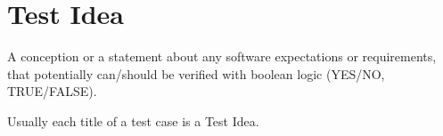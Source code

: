 \section{Test Idea}
\label{sec:Test Idea}

A conception or a statement about any software expectations or requirements, that potentially can/should be verified with boolean logic (YES/NO, TRUE/FALSE).

Usually each title of a test case is a Test Idea.
